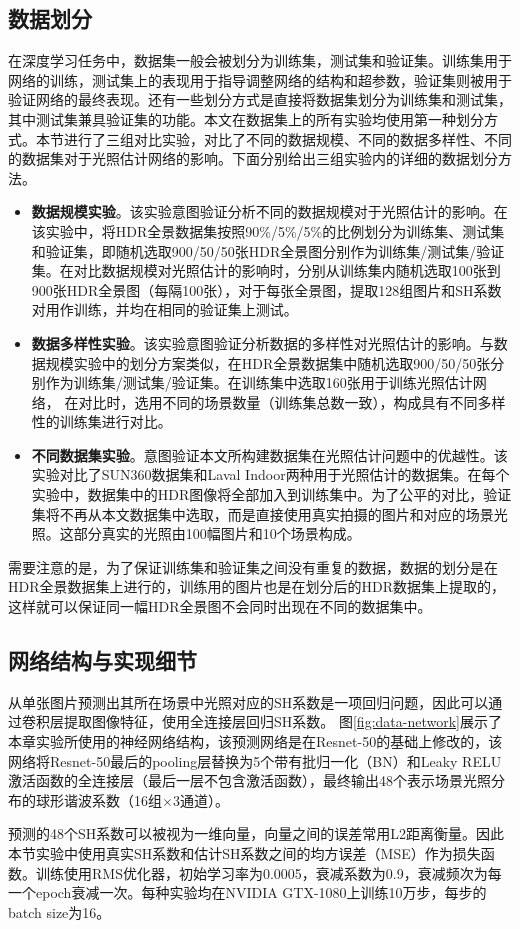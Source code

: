 \subsection{数据划分}
在深度学习任务中，数据集一般会被划分为训练集，测试集和验证集。训练集用于网络的训练，测试集上的表现用于指导调整网络的结构和超参数，验证集则被用于验证网络的最终表现。还有一些划分方式是直接将数据集划分为训练集和测试集，其中测试集兼具验证集的功能。本文在数据集上的所有实验均使用第一种划分方式。本节进行了三组对比实验，对比了不同的数据规模、不同的数据多样性、不同的数据集对于光照估计网络的影响。下面分别给出三组实验内的详细的数据划分方法。
\begin{itemize}
    \item \textbf{数据规模实验}。该实验意图验证分析不同的数据规模对于光照估计的影响。在该实验中，将HDR全景数据集按照90\%/5\%/5\%的比例划分为训练集、测试集和验证集，即随机选取900/50/50张HDR全景图分别作为训练集/测试集/验证集。在对比数据规模对光照估计的影响时，分别从训练集内随机选取100张到900张HDR全景图（每隔100张），对于每张全景图，提取128组图片和SH系数对用作训练，并均在相同的验证集上测试。
    \item \textbf{数据多样性实验}。该实验意图验证分析数据的多样性对光照估计的影响。与数据规模实验中的划分方案类似，在HDR全景数据集中随机选取900/50/50张分别作为训练集/测试集/验证集。在训练集中选取160张用于训练光照估计网络， 在对比时，选用不同的场景数量（训练集总数一致），构成具有不同多样性的训练集进行对比。
    \item \textbf{不同数据集实验}。意图验证本文所构建数据集在光照估计问题中的优越性。该实验对比了SUN360\cite{xiao2012recognizing}数据集和Laval Indoor\cite{gardner2017learning}两种用于光照估计的数据集。在每个实验中，数据集中的HDR图像将全部加入到训练集中。为了公平的对比，验证集将不再从本文数据集中选取，而是直接使用真实拍摄的图片和对应的场景光照。这部分真实的光照由100幅图片和10个场景构成。
\end{itemize}

需要注意的是，为了保证训练集和验证集之间没有重复的数据，数据的划分是在HDR全景数据集上进行的，训练用的图片也是在划分后的HDR数据集上提取的，这样就可以保证同一幅HDR全景图不会同时出现在不同的数据集中。
\subsection{网络结构与实现细节}
从单张图片预测出其所在场景中光照对应的SH系数是一项回归问题，因此可以通过卷积层提取图像特征，使用全连接层回归SH系数。
图\ref{fig:data-network}展示了本章实验所使用的神经网络结构，该预测网络是在Resnet-50\cite{he2016deep}的基础上修改的，该网络将Resnet-50最后的pooling层替换为5个带有批归一化（BN）\cite{ioffe2015batch}和Leaky RELU激活函数\cite{maas2013rectifier}的全连接层（最后一层不包含激活函数），最终输出48个表示场景光照分布的球形谐波系数（16组$\times$3通道）。

预测的48个SH系数可以被视为一维向量，向量之间的误差常用L2距离衡量。因此本节实验中使用真实SH系数和估计SH系数之间的均方误差（MSE）作为损失函数。训练使用RMS优化器\cite{tieleman2012lecture}，初始学习率为0.0005，衰减系数为0.9，衰减频次为每一个epoch衰减一次。每种实验均在NVIDIA GTX-1080上训练10万步，每步的batch size为16。
